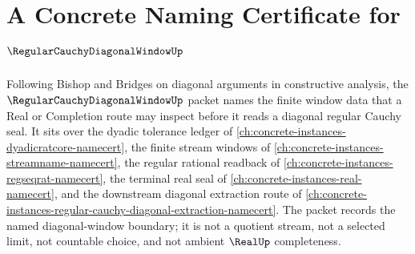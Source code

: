 \chapter{A Concrete Naming Certificate for $\RegularCauchyDiagonalWindowUp$}
\label{ch:concrete-instances-regular-cauchy-diagonal-window-namecert}

Following Bishop and Bridges on diagonal arguments in constructive analysis, the $\RegularCauchyDiagonalWindowUp$ packet names the finite window data that a Real or Completion route may inspect before it reads a diagonal regular Cauchy seal. It sits over the dyadic tolerance ledger of \autoref{ch:concrete-instances-dyadicratcore-namecert}, the finite stream windows of \autoref{ch:concrete-instances-streamname-namecert}, the regular rational readback of \autoref{ch:concrete-instances-regseqrat-namecert}, the terminal real seal of \autoref{ch:concrete-instances-real-namecert}, and the downstream diagonal extraction route of \autoref{ch:concrete-instances-regular-cauchy-diagonal-extraction-namecert}. The packet records the named diagonal-window boundary; it is not a quotient stream, not a selected limit, not countable choice, and not ambient $\RealUp$ completeness.

